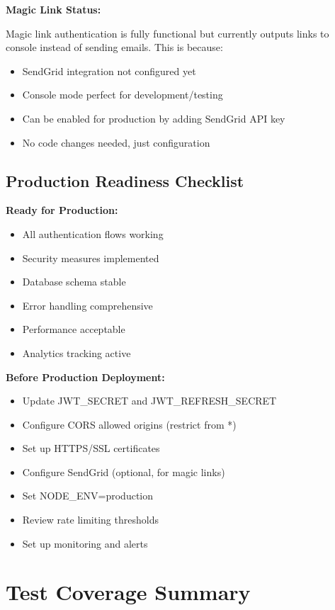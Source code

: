 \documentclass[11pt,a4paper]{article}
\begin{document}
\textbf{Magic Link Status:}

Magic link authentication is fully functional but currently outputs links to console instead of sending emails. This is because:
\begin{itemize}
    \item SendGrid integration not configured yet
    \item Console mode perfect for development/testing
    \item Can be enabled for production by adding SendGrid API key
    \item No code changes needed, just configuration
\end{itemize}

\subsection{Production Readiness Checklist}

\textbf{Ready for Production:}
\begin{itemize}
    \item[\textcolor{passgreen}{✓}] All authentication flows working
    \item[\textcolor{passgreen}{✓}] Security measures implemented
    \item[\textcolor{passgreen}{✓}] Database schema stable
    \item[\textcolor{passgreen}{✓}] Error handling comprehensive
    \item[\textcolor{passgreen}{✓}] Performance acceptable
    \item[\textcolor{passgreen}{✓}] Analytics tracking active
\end{itemize}

\textbf{Before Production Deployment:}
\begin{itemize}
    \item Update JWT\_SECRET and JWT\_REFRESH\_SECRET
    \item Configure CORS allowed origins (restrict from *)
    \item Set up HTTPS/SSL certificates
    \item Configure SendGrid (optional, for magic links)
    \item Set NODE\_ENV=production
    \item Review rate limiting thresholds
    \item Set up monitoring and alerts
\end{itemize}

\section{Test Coverage Summary}
\end{document}
